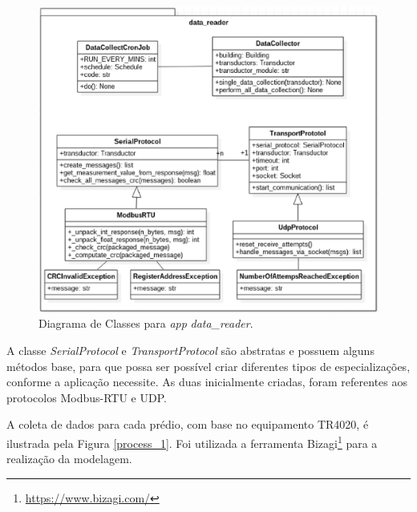 \begin{figure}[!h]
    \centering
    \includegraphics[keepaspectratio=true,scale=0.7]{figuras/data_reader.eps}
    \caption{Diagrama de Classes para \textit{app} \textit{data\_reader}.}
    \label{data_reader}
\end{figure}

A classe \textit{SerialProtocol} e \textit{TransportProtocol} são abstratas e possuem alguns métodos base, para que possa ser possível criar diferentes tipos de especializações, conforme a aplicação necessite. As duas inicialmente criadas, foram referentes aos protocolos Modbus-RTU e UDP.

A coleta de dados para cada prédio, com base no equipamento TR4020, é ilustrada pela Figura \ref{process_1}. Foi utilizada a ferramenta Bizagi\footnote{\url{https://www.bizagi.com/}} para a realização da modelagem.

